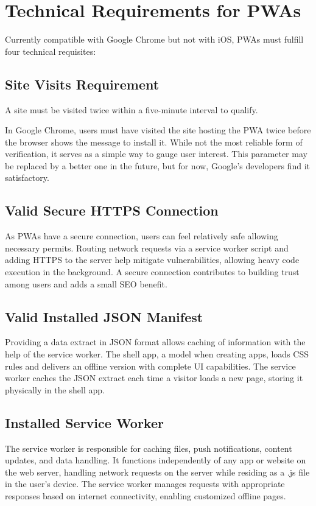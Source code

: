 \documentclass[conference]{IEEEtran}
\begin{document}
\section{Technical Requirements for PWAs}
Currently compatible with Google Chrome but not with iOS, PWAs must fulfill four technical requisites:

\subsection{Site Visits Requirement}
A site must be visited twice within a five-minute interval to qualify.

In Google Chrome, users must have visited the site hosting the PWA twice before the browser shows the message to install it. While not the most reliable form of verification, it serves as a simple way to gauge user interest. This parameter may be replaced by a better one in the future, but for now, Google's developers find it satisfactory.

\subsection{Valid Secure HTTPS Connection}
As PWAs have a secure connection, users can feel relatively safe allowing necessary permits. Routing network requests via a service worker script and adding HTTPS to the server help mitigate vulnerabilities, allowing heavy code execution in the background. A secure connection contributes to building trust among users and adds a small SEO benefit.

\subsection{Valid Installed JSON Manifest}
Providing a data extract in JSON format allows caching of information with the help of the service worker. The shell app, a model when creating apps, loads CSS rules and delivers an offline version with complete UI capabilities. The service worker caches the JSON extract each time a visitor loads a new page, storing it physically in the shell app.

\subsection{Installed Service Worker}
The service worker is responsible for caching files, push notifications, content updates, and data handling. It functions independently of any app or website on the web server, handling network requests on the server while residing as a .js file in the user's device. The service worker manages requests with appropriate responses based on internet connectivity, enabling customized offline pages.
\end{document}
